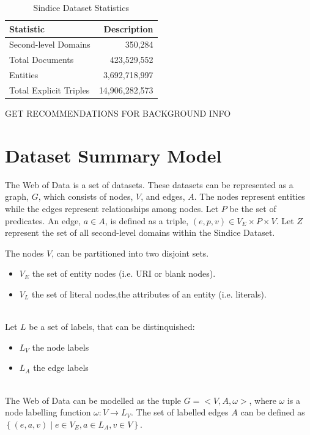 \documentclass[11pt,onecolumn]{article}
\begin{document}
\begin{table}[h!]
\begin{center}
  \begin{tabular}{| l | r | }
    \hline
    {\bf Statistic}   & {\bf Description} \\ \hline
    Second-level Domains & 350,284 \\ \hline
    Total Documents & 423,529,552 \\ \hline
    Entities & 3,692,718,997 \\ \hline
    Total Explicit Triples & 14,906,282,573 \\ \hline
  \end{tabular}
 \caption{Sindice Dataset Statistics}
\end{center}

\end{table}

GET RECOMMENDATIONS FOR BACKGROUND INFO


\section{Dataset Summary Model}
The Web of Data is a set of datasets.  These datasets can be represented as a graph, $G$, which consists of nodes, $V$, and edges, $A$.  The nodes represent entities while the edges represent relationships among nodes. Let $P$ be the set of predicates. An edge, $a \in A$, is defined as a triple, $(e,p,v) \in V_E \times P \times V$.  Let $Z$ represent the set of all second-level domains within the Sindice Dataset.

The nodes $V$, can be partitioned into two disjoint sets.
\begin{itemize}
  \item $V_E$ the set of entity nodes (i.e. URI or blank nodes).
  \item $V_L$ the set of literal nodes,the attributes of an entity (i.e. literals).
\end{itemize}\\


Let $L$ be a set of labels, that can be distinquished:
\begin{itemize}
  \item $L_V$ the node labels
  \item $L_A$ the edge labels
\end{itemize}\\


The Web of Data can be modelled as the tuple $G =<V,A,\omega>$, where $\omega$ is a node labelling function $\omega: V \rightarrow L_V$.  The set of labelled edges $A$ can be defined as $\left\{ (e,a,v) \mid e \in V_E, a \in L_A, v \in V \right\}$.
\end{document}
